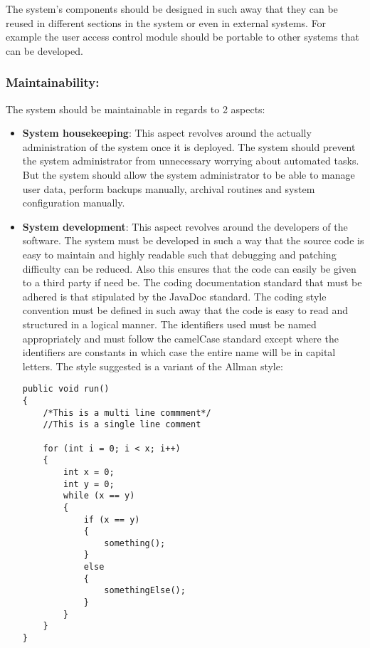 \begin{flushleft}

The system's components should be designed in such away that they can be reused in different sections in the system or even in external systems. For example the user access control module should be portable to other systems that can be developed.

\end{flushleft}

\vspace{0.1in}

\vspace{0.2in}
\newpage
\subsubsection{Maintainability:}

\begin{flushleft}
The system should be maintainable in regards to 2 aspects: 
\begin{itemize}
\item \textbf{System housekeeping}: This aspect revolves around the actually administration of the system once it is deployed. The system should prevent the system administrator from unnecessary worrying about automated tasks. But the system should allow the system administrator to be able to manage user data, perform backups manually, archival routines and system configuration manually. 
\item \textbf{System development}: This aspect revolves around the developers of the software. The system must be developed in such a way that the source code is easy to maintain and highly readable such that debugging and patching difficulty can be reduced. Also this ensures that the code can easily be given to a third party if need be. The coding documentation standard that must be adhered is that stipulated by the JavaDoc standard. The coding style convention must be defined in such away that the code is easy to read and structured in a logical manner. The identifiers used must be named appropriately and must follow the camelCase standard except where the identifiers are constants in which case the entire name will be in capital letters. The style suggested is a variant of the Allman style:
\begin{lstlisting}
public void run()
{
	/*This is a multi line commment*/
	//This is a single line comment
	
	for (int i = 0; i < x; i++)
	{
		int x = 0;
		int y = 0;
		while (x == y)
		{
			if (x == y)
			{
			    something();			    
			}
			else
			{
				somethingElse();
			}
		}
	}
}
\end{lstlisting}
\end{itemize}


\end{flushleft}

\vspace{0.1in}